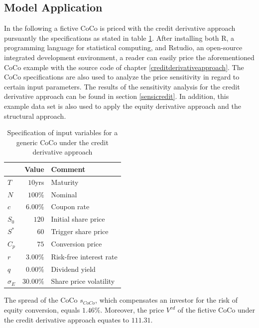 \subsection{Model Application}

In the following a fictive CoCo is priced with the credit derivative approach pursuantly the specifications as stated in table \ref{creditcoco}. After installing both R, a programming language for statistical computing, and Rstudio, an open-source integrated development environment, a reader can easily price the aforementioned CoCo example with the source code of chapter \ref{creditderivativeapproach}. The CoCo specifications are also used to analyze the price sensitivity in regard to certain input parameters. The results of the sensitivity analysis for the credit derivative approach can be found in section \ref{sensicredit}. In addition, this example data set is also used to apply the equity derivative approach and the structural approach.

\begin{table}[H]
 \setlength{\extrarowheight}{2.5pt}
 \centering
 \begin{tabular}{lrl}
  \toprule
    & \textbf{Value} & \textbf{Comment} \\
  \midrule
   $T$ & $10$yrs & Maturity \\
   $N$ & $100\%$ & Nominal \\   
   $c$ & $6.00\%$ & Coupon rate \\
   $S_0$ & $120$ & Initial share price\\
   $S^*$ & $60$ & Trigger share price \\
   $C_p$ & $75$ & Conversion price \\
   $r$ & $3.00 \%$ & Risk-free interest rate\\
   $q$ & $0.00\%$ & Dividend yield \\
   $\sigma_E$ & $30.00\%$ & Share price volatility \\
  \bottomrule
 \end{tabular}
 \caption[Specification of input variables for a generic CoCo under the credit derivative approach]{Specification of input variables for a generic CoCo under the credit derivative approach \citep{alvemar2012modelling}}
 \label{creditcoco}
\end{table}

The spread of the CoCo $s_{CoCo}$, which compensates an investor for the risk of equity conversion, equals $1.46\%$. Moreover,  the price $V^{cd}$ of the fictive CoCo under the credit derivative approach equates to $111.31$.

